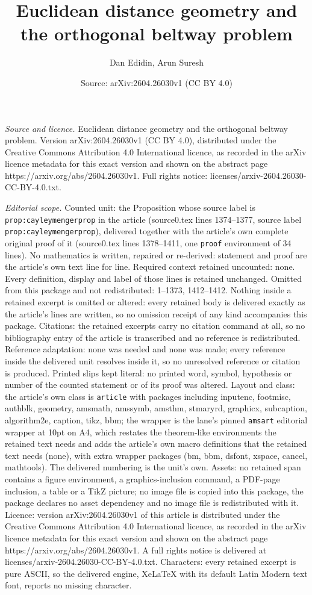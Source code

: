 \documentclass[10pt,a4paper]{amsart}
\title[Euclidean distance geometry and the orthogonal beltway probl]{Euclidean distance geometry and the orthogonal beltway problem}
\author{Dan Edidin, Arun Suresh}
\date{Source: arXiv:2604.26030v1 (CC BY 4.0)}
\begin{document}
\maketitle

\noindent\emph{Source and licence.} Euclidean distance geometry and the orthogonal beltway problem. Version arXiv:2604.26030v1 (CC BY 4.0), distributed under the Creative Commons Attribution 4.0 International licence, as recorded in the arXiv licence metadata for this exact version and shown on the abstract page https://arxiv.org/abs/2604.26030v1. Full rights notice: licenses/arxiv-2604.26030-CC-BY-4.0.txt.\par\smallskip

\noindent\textit{Editorial scope.} Counted unit: the Proposition whose source label is \texttt{prop:cayleymengerprop} in the article (source0.tex lines 1374--1377, source label \texttt{prop:cayleymengerprop}), delivered together with the article's own complete original proof of it (source0.tex lines 1378--1411, one \texttt{proof} environment of 34 lines). No mathematics is written, repaired or re-derived: statement and proof are the article's own text line for line. Required context retained uncounted: none. Every definition, display and label of those lines is retained unchanged. Omitted from this package and not redistributed: 1--1373, 1412--1412. Nothing inside a retained excerpt is omitted or altered: every retained body is delivered exactly as the article's lines are written, so no omission receipt of any kind accompanies this package. Citations: the retained excerpts carry no citation command at all, so no bibliography entry of the article is transcribed and no reference is redistributed. Reference adaptation: none was needed and none was made; every reference inside the delivered unit resolves inside it, so no unresolved reference or citation is produced. Printed slips kept literal: no printed word, symbol, hypothesis or number of the counted statement or of its proof was altered. Layout and class: the article's own class is \texttt{article} with packages including inputenc, footmisc, authblk, geometry, amsmath, amssymb, amsthm, stmaryrd, graphicx, subcaption, algorithm2e, caption, tikz, bbm; the wrapper is the lane's pinned \texttt{amsart} editorial wrapper at 10pt on A4, which restates the theorem-like environments the retained text needs and adds the article's own macro definitions that the retained text needs (none), with extra wrapper packages (bm, bbm, dsfont, xspace, cancel, mathtools). The delivered numbering is the unit's own. Assets: no retained span contains a figure environment, a graphics-inclusion command, a PDF-page inclusion, a table or a TikZ picture; no image file is copied into this package, the package declares no asset dependency and no image file is redistributed with it. Licence: version arXiv:2604.26030v1 of this article is distributed under the Creative Commons Attribution 4.0 International licence, as recorded in the arXiv licence metadata for this exact version and shown on the abstract page https://arxiv.org/abs/2604.26030v1. A full rights notice is delivered at licenses/arxiv-2604.26030-CC-BY-4.0.txt. Characters: every retained excerpt is pure ASCII, so the delivered engine, XeLaTeX with its default Latin Modern text font, reports no missing character.
\end{document}
